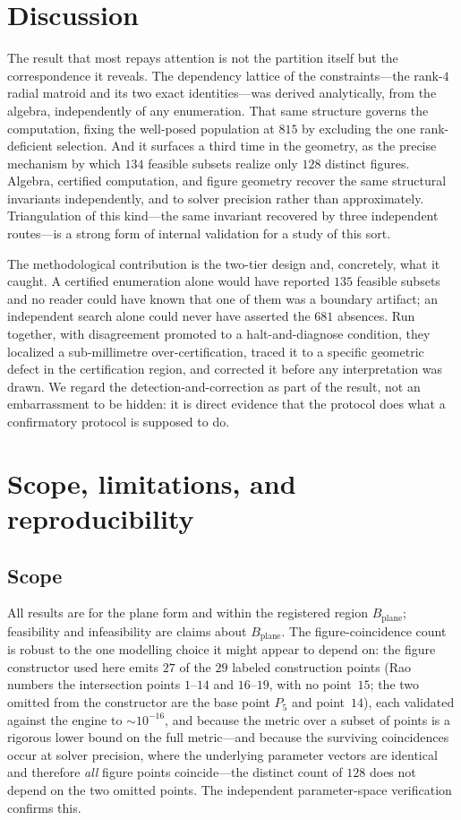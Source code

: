 \documentclass[pdflatex,sn-mathphys-num]{sn-jnl}
\newcommand{\Bplane}{B_{\mathrm{plane}}}
\begin{document}
\section{Discussion}\label{sec4}

The result that most repays attention is not the partition itself but the correspondence it reveals. The dependency lattice of the constraints---the rank-$4$ radial matroid and its two exact identities---was derived analytically, from the algebra, independently of any enumeration. That same structure governs the computation, fixing the well-posed population at $815$ by excluding the one rank-deficient selection. And it surfaces a third time in the geometry, as the precise mechanism by which $134$ feasible subsets realize only $128$ distinct figures. Algebra, certified computation, and figure geometry recover the same structural invariants independently, and to solver precision rather than approximately. Triangulation of this kind---the same invariant recovered by three independent routes---is a strong form of internal validation for a study of this sort.

The methodological contribution is the two-tier design and, concretely, what it caught. A certified enumeration alone would have reported $135$ feasible subsets and no reader could have known that one of them was a boundary artifact; an independent search alone could never have asserted the $681$ absences. Run together, with disagreement promoted to a halt-and-diagnose condition, they localized a sub-millimetre over-certification, traced it to a specific geometric defect in the certification region, and corrected it before any interpretation was drawn. We regard the detection-and-correction as part of the result, not an embarrassment to be hidden: it is direct evidence that the protocol does what a confirmatory protocol is supposed to do.

\section{Scope, limitations, and reproducibility}\label{sec:scope}

\subsection*{Scope}
All results are for the plane form and within the registered region $\Bplane$; feasibility and infeasibility are claims about $\Bplane$. The figure-coincidence count is robust to the one modelling choice it might appear to depend on: the figure constructor used here emits $27$ of the $29$ labeled construction points (Rao numbers the intersection points $1$--$14$ and $16$--$19$, with no point~$15$; the two omitted from the constructor are the base point $P_5$ and point~$14$), each validated against the engine to $\sim\!10^{-16}$, and because the metric over a subset of points is a rigorous lower bound on the full metric---and because the surviving coincidences occur at solver precision, where the underlying parameter vectors are identical and therefore \emph{all} figure points coincide---the distinct count of $128$ does not depend on the two omitted points. The independent parameter-space verification confirms this.
\end{document}
